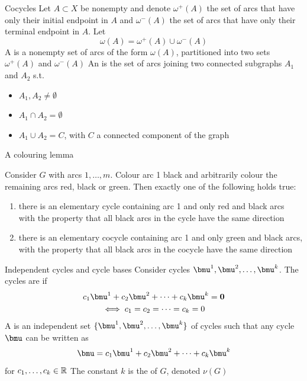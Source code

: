 \documentclass[aspectratio=43]{beamer}
\begin{document}
\begin{frame}{Cocycles}
	Let $A\subset X$ be nonempty and denote $\omega^+(A)$ the set of arcs that have only their initial endpoint in $A$ and $\omega^-(A)$ the set of arcs that have only their terminal endpoint in $A$. Let
	\[
	\omega(A)=\omega^+(A)\cup\omega^-(A)
	\]
	\vfill
	A  is a nonempty set of arcs of the form $\omega(A)$, partitioned into two sets $\omega^+(A)$ and $\omega^-(A)$
	\vfill
	An  is the set of arcs joining two connected subgraphs $A_1$ and $A_2$ s.t. 
	\begin{itemize}
		\item $A_1,A_2\neq\emptyset$
		\item $A_1\cap A_2=\emptyset$
		\item $A_1\cup A_2=C$, with $C$ a connected component of the graph
	\end{itemize}
\end{frame}


\begin{frame}{A colouring lemma}
	\begin{lemma}\label{lemma:arc_colouring_lemma}
		Consider $G$ with arcs $1,\ldots,m$. Colour arc 1 black and arbitrarily colour the remaining arcs red, black or green. Then exactly one of the following holds true:
		\begin{enumerate}
			\item there is an elementary cycle containing arc 1 and only red and black
			arcs with the property that all black arcs in the cycle have the same
			direction
			\item there is an elementary cocycle containing arc 1 and only green and black
			arcs, with the property that all black arcs in the cocycle have the same
			direction
		\end{enumerate}
	\end{lemma}
\end{frame}

\begin{frame}{Independent cycles and cycle bases}
	Consider cycles $\bmu^1,\bmu^2,\ldots,\bmu^k$. The cycles are  if
	\begin{multline*}
		c_1\bmu^1+c_2\bmu^2+\cdots+c_k\bmu^k=\b0 \\
		\iff
		c_1=c_2=\cdots=c_k=0
	\end{multline*}
	A  is an independent set $\{\bmu^1,\bmu^2,\ldots,\bmu^k\}$ of cycles such that any cycle $\bmu$ can be written as
	\[
	\bmu= c_1\bmu^1+c_2\bmu^2+\cdots+c_k\bmu^k
	\]
	for $c_1,\ldots,c_k\in\mathbb{R}$
	\vfill
	The constant $k$ is the  of $G$, denoted $\nu(G)$
\end{frame}
\end{document}
